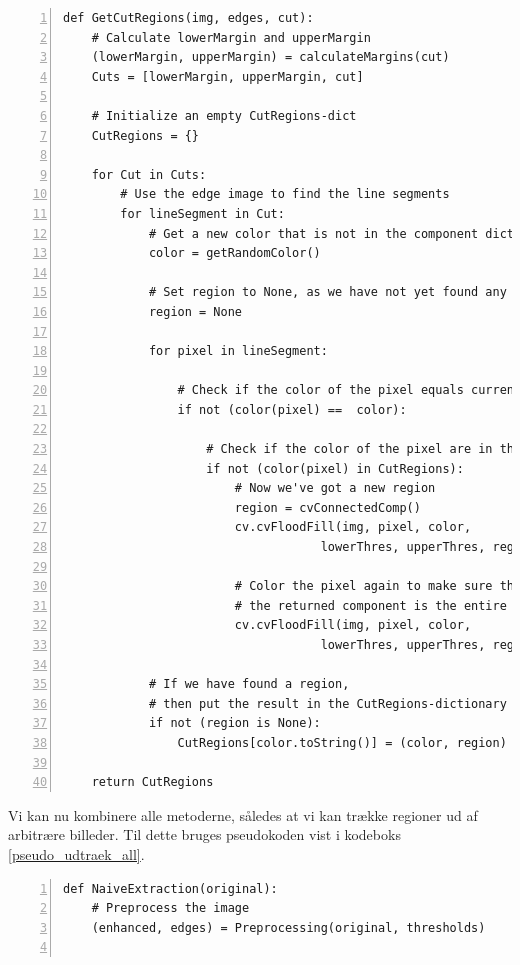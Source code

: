 {\begin{lstlisting}[caption={Pseudokode til udtrækning af regioner med
    margin.},captionpos=b,label={pseudo_udtraek_margin},numbers=left,
    frame=tb, breaklines=false, float=h]
def GetCutRegions(img, edges, cut):
    # Calculate lowerMargin and upperMargin
    (lowerMargin, upperMargin) = calculateMargins(cut)
    Cuts = [lowerMargin, upperMargin, cut]

    # Initialize an empty CutRegions-dict
    CutRegions = {}

    for Cut in Cuts:
        # Use the edge image to find the line segments
        for lineSegment in Cut:
            # Get a new color that is not in the component dictionary
            color = getRandomColor()

            # Set region to None, as we have not yet found any
            region = None

            for pixel in lineSegment:

                # Check if the color of the pixel equals current color
                if not (color(pixel) ==  color):

                    # Check if the color of the pixel are in the saved regions
                    if not (color(pixel) in CutRegions):
                        # Now we've got a new region
                        region = cvConnectedComp()
                        cv.cvFloodFill(img, pixel, color,
                                    lowerThres, upperThres, region)

                        # Color the pixel again to make sure that
                        # the returned component is the entire region
                        cv.cvFloodFill(img, pixel, color,
                                    lowerThres, upperThres, region)

            # If we have found a region,
            # then put the result in the CutRegions-dictionary
            if not (region is None):
                CutRegions[color.toString()] = (color, region)

    return CutRegions
\end{lstlisting}

Vi kan nu kombinere alle metoderne, således at vi kan trække regioner ud
af arbitrære billeder. Til dette bruges pseudokoden vist i kodeboks
\ref{pseudo_udtraek_all}.

\begin{lstlisting}[caption={Fuld udtrækning af regioner i et arbitært
    billede.},captionpos=b,label={pseudo_udtraek_all},numbers=left,
    frame=tb, breaklines=false, float=h]
def NaiveExtraction(original):
    # Preprocess the image
    (enhanced, edges) = Preprocessing(original, thresholds)


\end{lstlisting}}
